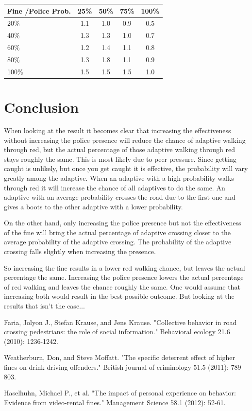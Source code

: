 \documentclass[a4paper]{article}
\begin{document}
\begin{table}[H]
\centering
\begin{tabular}{ l | c c c c }
  Fine \slash Police Prob. & 25\% & 50\% & 75\% & 100\% \\ 
  \hline
  20\%  & 1.1 & 1.0 & 0.9 & 0.5  \\
  40\%  & 1.3 & 1.3 & 1.0 & 0.7  \\
  60\%  & 1.2 & 1.4 & 1.1 & 0.8  \\
  80\%  & 1.3 & 1.8 & 1.1 & 0.9  \\
  100\% & 1.5 & 1.5 & 1.5 & 1.0  \\
\end{tabular}
\end{table}

\clearpage

\section{Conclusion}
When looking at the result it becomes clear that increasing the effectiveness without increasing the police presence will reduce the chance of adaptive walking through red, but the actual percentage of those adaptive walking through red stays roughly the same. This is most likely due to peer pressure. Since getting caught is unlikely, but once you get caught it is effective, the probability will vary greatly among the adaptive. When an adaptive with a high probability walks through red it will increase the chance of all adaptives to do the same. An adaptive with an average probability crosses the road due to the first one and gives a boots to the other adaptive with a lower probability.

On the other hand, only increasing the police presence but not the effectiveness of the fine will bring the actual percentage of adaptive crossing closer to the average probability of the adaptive crossing. The probability of the adaptive crossing falls slightly when increasing the presence.

So increasing the fine results in a lower red walking chance, but leaves the actual percentage the same. Increasing the police presence lowers the actual percentage of red walking and leaves the chance roughly the same. One would assume that increasing both would result in the best possible outcome. But looking at the results that isn't the case...

\clearpage

\begin{thebibliography}{3}

	 Faria, Jolyon J., Stefan Krause, and Jens Krause. "Collective behavior in road crossing pedestrians: the role of social information." Behavioral ecology 21.6 (2010): 1236-1242.

	 Weatherburn, Don, and Steve Moffatt. "The specific deterrent effect of higher fines on drink-driving offenders." British journal of criminology 51.5 (2011): 789-803.
    
     Haselhuhn, Michael P., et al. "The impact of personal experience on behavior: Evidence from video-rental fines." Management Science 58.1 (2012): 52-61.
    
\end{thebibliography}
\end{document}

